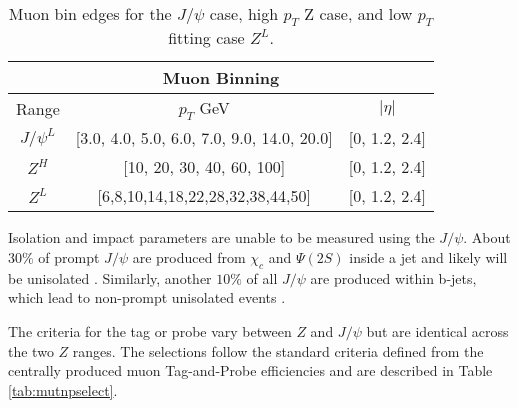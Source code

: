 \begin{table}
\centering
\caption{Muon bin edges for the $J/\psi$ case, high $p_T$ Z case, and low $p_T$ fitting case $Z^{L}$. }
\label{tab:mubin}
\begin{tabular}{c|c|c}
\hline 
\multicolumn{3}{c}{Muon Binning} \\ 
\hline 
Range & $p_T$ GeV & $|\eta|$ \\ 
\hline 
$J/\psi^{L}$ & [3.0, 4.0,  5.0, 6.0, 7.0, 9.0, 14.0,  20.0] & [0, 1.2, 2.4] \\ 

$Z^{H}$ &  [10, 20, 30, 40, 60, 100] & [0, 1.2, 2.4] \\ 

$Z^{L}$ & [6,8,10,14,18,22,28,32,38,44,50] & [0, 1.2, 2.4] \\ 
\hline 
\end{tabular} 
\end{table}



Isolation and impact parameters are unable to be measured using the $J/\psi$. About $30\%$ of prompt $J/\psi$ are produced from $\chi_c$ and $\Psi(2S)$ inside a jet and likely will be unisolated \cite{Lansberg:2006dh}. Similarly, another $10\%$ of all $J/\psi$ are produced within b-jets, which lead to non-prompt  unisolated events \cite{LHCb:2013itw}.

The criteria for the tag or probe vary between $Z$ and $J/\psi$ but are identical across the two $Z$ ranges. The selections follow the standard criteria defined from the centrally produced muon Tag-and-Probe efficiencies and are described in Table \ref{tab:mutnpselect}.\\

